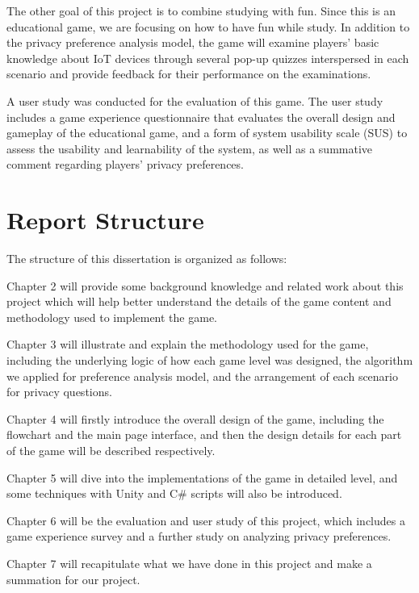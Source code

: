 \documentclass[msc,deptreport,ai]{infthesis}      %
\begin{document}
The other goal of this project is to combine studying with fun. Since this is an educational game, we are focusing on how to have fun while study. In addition to the privacy preference analysis model, the game will examine players' basic knowledge about IoT devices through several pop-up quizzes interspersed in each scenario and provide feedback for their performance on the examinations. 

A user study was conducted for the evaluation of this game. The user study includes a game experience questionnaire that evaluates the overall design and gameplay of the educational game, and a form of system usability scale (SUS) to assess the usability and learnability of the system, as well as a summative comment regarding players' privacy preferences.

\section{Report Structure}

The structure of this dissertation is organized as follows:

Chapter 2 will provide some background knowledge and related work about this project which will help better understand the details of the game content and methodology used to implement the game. 

Chapter 3 will illustrate and explain the methodology used for the game, including the underlying logic of how each game level was designed, the algorithm we applied for preference analysis model, and the arrangement of each scenario for privacy questions.

Chapter 4 will firstly introduce the overall design of the game, including the flowchart and the main page interface, and then the design details for each part of the game will be described respectively.

Chapter 5 will dive into the implementations of the game in detailed level, and some techniques with Unity and C\# scripts will also be introduced.

Chapter 6 will be the evaluation and user study of this project, which includes a game experience survey and a further study on analyzing privacy preferences.

Chapter 7 will recapitulate what we have done in this project and make a summation for our project.

\end{document}
